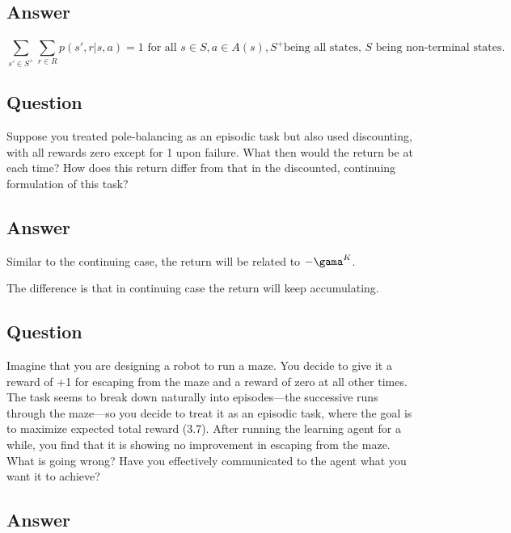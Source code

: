 \documentclass[11pt]{article}
\begin{document}
    \subsection*{Answer}

    \begin{equation}
        \sum_{s' \in S^+}^{} \sum_{r \in R}^{} p(s', r | s, a) = 1 \text{ for all } s \in S, a \in A(s), S^+ \text{being all states, } S \text{ being non-terminal states}.
    \end{equation}

    \subsection{Question}

    Suppose you treated pole-balancing as an episodic task but also used discounting, with all rewards zero except for 1 upon failure.
    What then would the return be at each time?
    How does this return differ from that in the discounted, continuing formulation of this task?

    \subsection*{Answer}

    Similar to the continuing case, the return will be related to $-\gama^K$.

    The difference is that in continuing case the return will keep accumulating.

    \subsection{Question}

    Imagine that you are designing a robot to run a maze.
    You decide to give it a reward of +1 for escaping from the maze and a reward of zero at all other times.
    The task seems to break down naturally into episodes—the successive runs through the maze—so you decide to treat it as an episodic task, where the goal is to maximize expected total reward (3.7).
    After running the learning agent for a while, you find that it is showing no improvement in escaping from the maze.
    What is going wrong?
    Have you effectively communicated to the agent what you want it to achieve?

    \subsection*{Answer}
\end{document}
